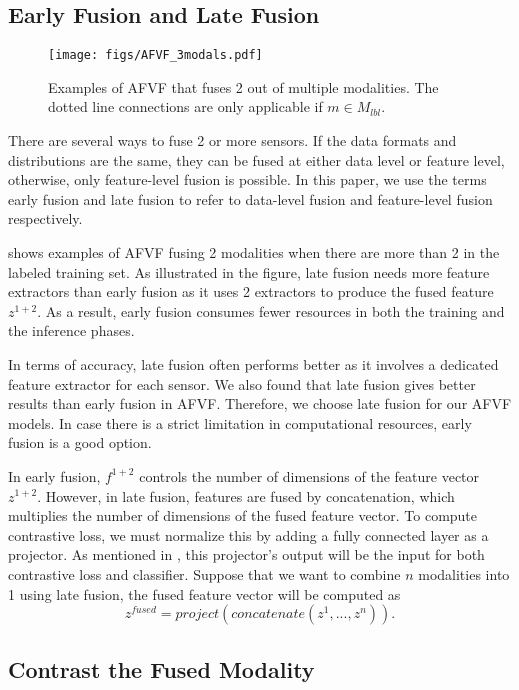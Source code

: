 \documentclass[conference]{IEEEtran}
\begin{document}
\subsection{Early Fusion and Late Fusion}
\begin{figure}[!t]
\captionsetup{justification=centering}
\centerline{\texttt{[image: figs/AFVF\_3modals.pdf]}}
\caption{Examples of AFVF that fuses 2 out of multiple modalities. The dotted line connections are only applicable if $m \in M_{lbl}$.}
\label{fig: afvf}
\end{figure}
There are several ways to fuse 2 or more sensors. If the data formats and distributions are the same, they can be fused at either data level or feature level, otherwise, only feature-level fusion is possible. In this paper, we use the terms early fusion and late fusion to refer to data-level fusion and feature-level fusion respectively.

 shows examples of AFVF fusing 2 modalities when there are more than 2 in the labeled training set. As illustrated in the figure, late fusion needs more feature extractors than early fusion as it uses 2 extractors to produce the fused feature $z^{1+2}$. As a result, early fusion consumes fewer resources in both the training and the inference phases.

In terms of accuracy, late fusion often performs better as it involves a dedicated feature extractor for each sensor. We also found that late fusion gives better results than early fusion in AFVF. Therefore, we choose late fusion for our AFVF models. In case there is a strict limitation in computational resources, early fusion is a good option.

In early fusion, $f^{1+2}$ controls the number of dimensions of the feature vector $z^{1+2}$. However, in late fusion, features are fused by concatenation, which multiplies the number of dimensions of the fused feature vector. To compute contrastive loss, we must normalize this by adding a fully connected layer as a projector. As mentioned in , this projector's output will be the input for both contrastive loss and classifier. Suppose that we want to combine $n$ modalities into 1 using late fusion, the fused feature vector will be computed as
\begin{equation}
    z^{fused} = project(concatenate(z^1, ..., z^n)).
\end{equation}

\subsection{Contrast the Fused Modality}
\label{subsec: contrast fused}
\end{document}
